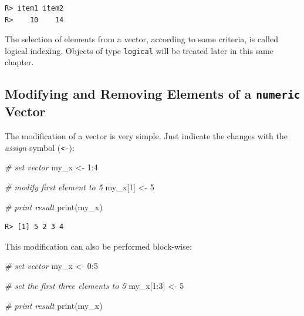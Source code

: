 \documentclass[
  12pt,
]{book}
\newenvironment{Shaded}{\begin{snugshade}}{\end{snugshade}}
\newcommand{\CommentTok}[1]{\textcolor[rgb]{0.37,0.37,0.37}{\textit{#1}}}
\newcommand{\DecValTok}[1]{\textcolor[rgb]{0.06,0.06,0.06}{#1}}
\newcommand{\FunctionTok}[1]{\textcolor[rgb]{0,0,0}{#1}}
\newcommand{\NormalTok}[1]{#1}
\newcommand{\OtherTok}[1]{\textcolor[rgb]{0.37,0.37,0.37}{#1}}
\newcommand{\SpecialCharTok}[1]{\textcolor[rgb]{0,0,0}{#1}}
\begin{document}
\begin{verbatim}
R> item1 item2 
R>    10    14
\end{verbatim}

The selection of elements from a vector, according to some criteria, is called logical indexing. Objects of type \texttt{logical} will be treated later in this same chapter.

\hypertarget{modifying-and-removing-elements-of-a-numeric-vector}{%
\subsection{\texorpdfstring{Modifying and Removing Elements of a \texttt{numeric} Vector}{Modifying and Removing Elements of a numeric Vector}}\label{modifying-and-removing-elements-of-a-numeric-vector}}

The modification of a vector is very simple. Just indicate the changes with the \emph{assign} symbol (\texttt{\textless{}-}): 

\begin{Shaded}
\begin{Highlighting}[]
\CommentTok{\# set vector}
\NormalTok{my\_x }\OtherTok{\textless{}{-}} \DecValTok{1}\SpecialCharTok{:}\DecValTok{4}

\CommentTok{\# modify first element to 5}
\NormalTok{my\_x[}\DecValTok{1}\NormalTok{] }\OtherTok{\textless{}{-}} \DecValTok{5}

\CommentTok{\# print result}
\FunctionTok{print}\NormalTok{(my\_x)}
\end{Highlighting}
\end{Shaded}

\begin{verbatim}
R> [1] 5 2 3 4
\end{verbatim}

This modification can also be performed block-wise:

\begin{Shaded}
\begin{Highlighting}[]
\CommentTok{\# set vector}
\NormalTok{my\_x }\OtherTok{\textless{}{-}} \DecValTok{0}\SpecialCharTok{:}\DecValTok{5}

\CommentTok{\# set the first three elements to 5}
\NormalTok{my\_x[}\DecValTok{1}\SpecialCharTok{:}\DecValTok{3}\NormalTok{] }\OtherTok{\textless{}{-}} \DecValTok{5}

\CommentTok{\# print result}
\FunctionTok{print}\NormalTok{(my\_x)}
\end{Highlighting}
\end{Shaded}
\end{document}
